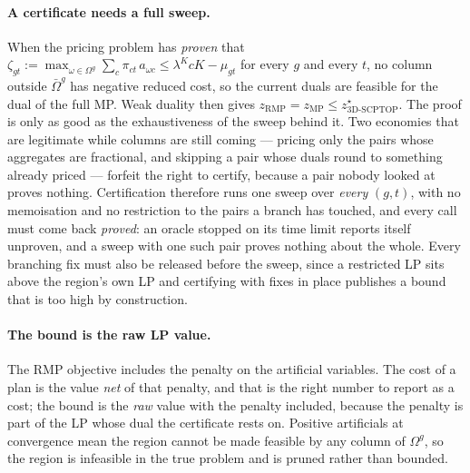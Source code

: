 \paragraph{A certificate needs a full sweep.}
When the pricing problem has \emph{proven} that
$\zeta_{gt}:=\max_{\omega\in\Omega^{g}}\sum_{c}\pi_{ct}\,a_{\omega c}
\le \lambda^{K}cK-\mu_{gt}$ for every $g$ and every $t$, no column outside
$\bar\Omega^{g}$ has negative reduced cost, so the current duals are
feasible for the dual of the full MP. Weak duality then gives
$z_{\mathrm{RMP}}=z_{\mathrm{MP}}\le z^{\star}_{\text{3D-SCPTOP}}$. The
proof is only as good as the exhaustiveness of the sweep behind it.
Two economies that are legitimate while columns are still coming ---
pricing only the pairs whose aggregates are fractional, and skipping a
pair whose duals round to something already priced --- forfeit the right
to certify, because a pair nobody looked at proves nothing.
Certification therefore runs one sweep over \emph{every} $(g,t)$, with
no memoisation and no restriction to the pairs a branch has touched,
and every call must come back \emph{proved}: an oracle stopped on its
time limit reports itself unproven, and a sweep with one such pair
proves nothing about the whole. Every branching fix must also be
released before the sweep, since a restricted LP sits above the
region's own LP and certifying with fixes in place publishes a bound
that is too high by construction.

\paragraph{The bound is the raw LP value.}
The RMP objective includes the penalty on the artificial variables. The
cost of a plan is the value \emph{net} of that penalty, and that is the
right number to report as a cost; the bound is the \emph{raw} value
with the penalty included, because the penalty is part of the LP whose
dual the certificate rests on. Positive artificials at convergence mean
the region cannot be made feasible by any column of $\Omega^{g}$, so
the region is infeasible in the true problem and is pruned rather than
bounded.

